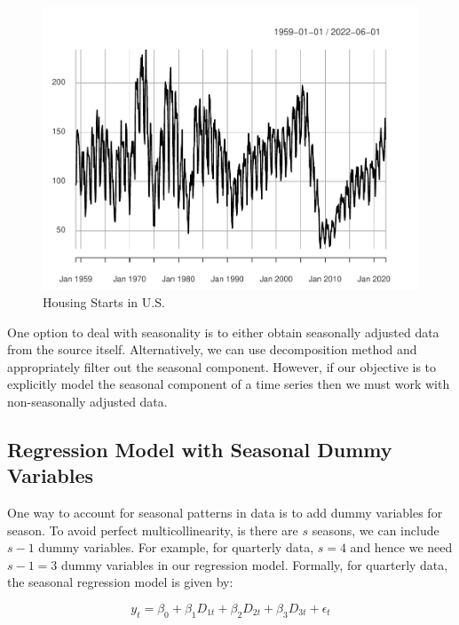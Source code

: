 \documentclass[]{book}
\theoremstyle{definition}
\theoremstyle{definition}
\theoremstyle{definition}
\theoremstyle{remark}
\begin{document}
\begin{figure}

{\centering \includegraphics[width=0.8\linewidth]{bookdown-demo_files/figure-latex/ch5-figure4-1} 

}

\caption{Housing Starts in U.S.}\label{fig:ch5-figure4}
\end{figure}

One option to deal with seasonality is to either obtain seasonally
adjusted data from the source itself. Alternatively, we can use
decomposition method and appropriately filter out the seasonal
component. However, if our objective is to explicitly model the seasonal
component of a time series then we must work with non-seasonally
adjusted data.

\hypertarget{regression-model-with-seasonal-dummy-variables}{%
\subsection{Regression Model with Seasonal Dummy
Variables}\label{regression-model-with-seasonal-dummy-variables}}

One way to account for seasonal patterns in data is to add dummy
variables for season. To avoid perfect multicollinearity, is there are
\(s\) seasons, we can include \(s-1\) dummy variables. For example, for
quarterly data, \(s=4\) and hence we need \(s-1=3\) dummy variables in
our regression model. Formally, for quarterly data, the seasonal
regression model is given by:

\begin{equation}
y_t= \beta_0 + \beta_1 D_{1t}+ \beta_2 D_{2t} + \beta_3 D_{3t} + \epsilon_t
\end{equation}
\end{document}
